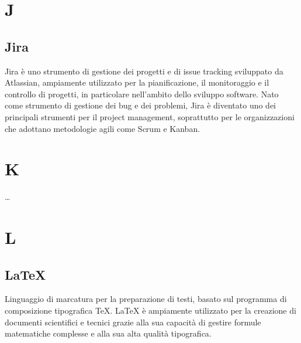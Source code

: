 
\section*{J}

\subsection*{Jira}
Jira è uno strumento di gestione dei progetti e di issue tracking sviluppato da Atlassian, ampiamente utilizzato per la pianificazione, il monitoraggio e 
il controllo di progetti, in particolare nell'ambito dello sviluppo software. Nato come strumento di gestione dei bug e dei problemi, Jira è diventato uno 
dei principali strumenti per il project management, soprattutto per le organizzazioni che adottano metodologie agili come Scrum e Kanban.

\newpage



\section*{K}

\dots

\newpage



\section*{L}

\subsection*{\LaTeX}
Linguaggio di marcatura per la preparazione di testi, basato sul programma di composizione tipografica TeX. LaTeX è ampiamente utilizzato per la creazione 
di documenti scientifici e tecnici grazie alla sua capacità di gestire formule matematiche complesse e alla sua alta qualità tipografica.

\newpage